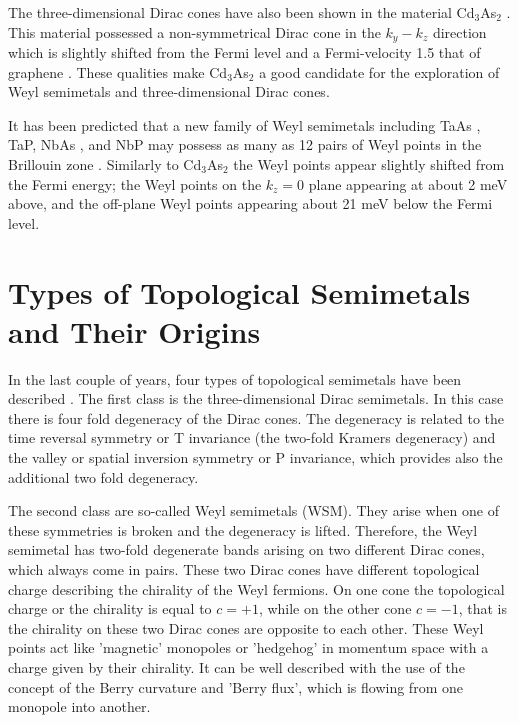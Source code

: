 \documentclass[prb,twocolumn,aps,superscriptaddress,showpacs,floatfix]{revtex4}
\begin{document}
	The three-dimensional Dirac cones have also been shown in the material Cd$_{3}$As$_{2}$ \cite{b34,p2,b35,b36}. This material possessed a non-symmetrical Dirac cone \cite{b34} in the $k_{y}-k_{z}$ direction which is slightly shifted from the Fermi level \cite{p2} and a Fermi-velocity 1.5 that of graphene \cite{b35}. These qualities make Cd$_{3}$As$_{2}$ a good candidate for the exploration of Weyl semimetals and three-dimensional Dirac cones.

	It has been predicted that a new family of Weyl semimetals including TaAs \cite{c1,c2}, TaP, NbAs \cite{c3}, and NbP may possess as many as 12 pairs of Weyl points in the Brillouin zone \cite{p3}. Similarly to Cd$_{3}$As$_{2}$ the Weyl points appear slightly shifted from the Fermi energy; the Weyl points on the $k_{z}=0$ plane appearing at about 2 meV above, and the off-plane Weyl points appearing about 21 meV below the Fermi level.


\section{ Types of Topological Semimetals and Their Origins}
	In the last couple of years, four types of topological semimetals have been described \cite{Bernevig2016,Kane2016,Nayak2017}. The first class is the three-dimensional Dirac semimetals. In this case there is four fold degeneracy of the Dirac cones. The degeneracy is related to the time reversal symmetry or T invariance (the  two-fold Kramers degeneracy) and the valley or spatial inversion symmetry or P invariance, which provides also the additional two fold degeneracy. 

	The second class are so-called Weyl semimetals (WSM). They arise when one of these symmetries is broken and the degeneracy is lifted. Therefore, the Weyl semimetal has two-fold degenerate bands arising on two different Dirac cones, which always come in pairs. These two Dirac cones have different topological charge describing the chirality 
of the Weyl fermions. On one cone the topological charge or the chirality is equal to $c=+1$, while on the other cone $c=-1$, that is the chirality on these two Dirac cones are opposite to each other. These Weyl points act like 'magnetic' monopoles or 'hedgehog' in momentum space with a charge given by their chirality. It can be well described with the use of the concept of the Berry curvature and 'Berry flux', which is flowing from one monopole into another.  
\end{document}
